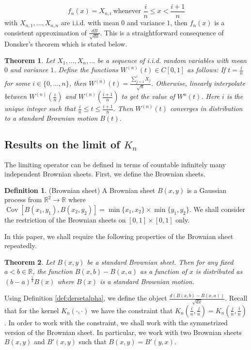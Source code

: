 \documentclass[reqno,12pt]{amsart}
\theoremstyle{plain}
\newtheorem{theorem}{Theorem}
\theoremstyle{definition}
\newtheorem{definition}{Definition}
\DeclareMathOperator{\Cov}{Cov}
\begin{document}
\begin{equation}\label{der:browsqrt}
f_{n}(x)= X_{n,i} ~ \text{whenever } \frac{i}{n}\le x < \frac{i+1}{n}
\end{equation}
with $X_{n,1},\ldots, X_{n,n}$ are i.i.d. with mean $0$ and variance $1$, then $f_{n}(x)$ is a consistent approximation of $\frac{dB}{\sqrt{dx}}$. This is a straightforward consequence of Donsker's theorem \cite{donsker1951invariance} which is stated below. 
\begin{theorem}
Let $X_{1},\ldots, X_{n},\ldots$ be a sequence of i.i.d. random variables with mean $0$ and variance $1$. Define the functions $W^{(n)}(t) \in C[0,1]$ as follows: If $t= \frac{i}{n}$ for some $i \in \{ 0,\ldots, n \}$, then $W^{(n)}(t)= \frac{\sum_{j=1}^{i}X_{j}}{\sqrt{n}}$. Otherwise, linearly interpolate between $W^{(n)}(\frac{i}{n})$ and $W^{(n)}(\frac{i+1}{n})$ to get the value of $W^{n}(t)$. Here $i$ is the unique integer such that $\frac{i}{n}\le t \le \frac{i+1}{n}$. Then $W^{(n)}(t)$ converges in distribution to a standard Brownian motion $B(t)$.
\end{theorem} 
\subsection{Results on the limit of $K_{n}$ }
The limiting operator can be defined in terms of countable infinitely many independent Brownian sheets. First, we define the Brownian sheets.
\begin{definition}(Brownian sheet)
A Brownian sheet $B(x,y)$ is a Gaussian process from $\mathbb{R}^2 \to \mathbb{R}$ where $\Cov[B(x_{1},y_{1}), B(x_{2},y_{2})]= \min\{ x_{1}, x_{2} \}\times \min\{y_{1},y_{2}\}$. We shall consider the restriction of the Brownian sheets on $[0,1] \times [0,1]$ only.
\end{definition}
In this paper, we shall require the following properties of the Brownian sheet repeatedly. 
\begin{theorem}
    Let $B(x,y)$ be a standard Brownian sheet. Then for any fixed $a<b \in \mathbb{R}$, the function $B(x,b)-B(x,a)$ as a function of $x$ is distributed as $(b-a)^{\frac{1}{2}}B(x)$ where $B(x)$ is a standard Brownian motion.
\end{theorem}
Using Definition \ref{def:dersetalpha},  we define the object $\frac{d(B(x,b)-B(x,a))}{\sqrt{dx}}$.
Recall that for the kernel $K_{n}\left( \cdot, \cdot \right)$ we have the constraint that $K_{n}\left(\frac{i}{n}, \frac{j}{n}\right)= K_{n}\left(\frac{j}{n}, \frac{i}{n}\right)$. In order to work with the constraint, we shall work with the symmetrized version of the Brownian sheet. In particular, we work with two Brownian sheets $B(x,y)$ and $B'(x,y)$ such that $B(x,y)= B'(y,x)$.
\end{document}
